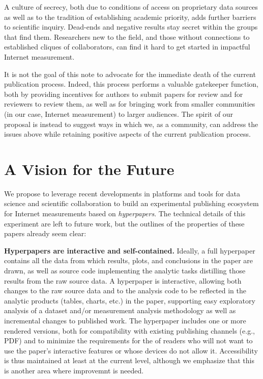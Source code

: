 \documentclass[sigconf,10pt]{acmart}
\begin{document}
A culture of secrecy, both due to conditions of access on proprietary data
sources as well as to the tradition of establishing academic priority, adds
further barriers to scientific inquiry. Dead-ends and negative results stay
secret within the groups that find them. Researchers new to the field, and those
without connections to established cliques of collaborators, can find it hard to
get started in impactful Internet measurement. 

It is not the goal of this note to advocate for the immediate death of the
current publication process. Indeed, this process performs a valuable gatekeeper
function, both by providing incentives for authors to submit papers for review
and for reviewers to review them, as well as for bringing work from smaller
communities (in our case, Internet measurement) to larger audiences. The spirit
of our proposal is instead to suggest ways in which we, as a community, can
address the issues above while retaining positive aspects of the current
publication process.

\section{A Vision for the Future}
\label{sec:vision}

We propose to leverage recent developments in platforms and tools for data
science and scientific collaboration to build an experimental publishing
ecosystem for Internet measurements based on {\em hyperpapers}. The technical
details of this experiment are left to future work, but the outlines of the
properties of these papers already seem clear:

\textbf{Hyperpapers are interactive and self-contained.} Ideally, a full
hyperpaper contains all the data from which results, plots, and conclusions in
the paper are drawn, as well as source code implementing the analytic tasks
distilling those results from the raw source data. A hyperpaper is interactive,
allowing both changes to the raw source data and to the analysis code to be
reflected in the analytic products (tables, charts, etc.) in the paper,
supporting easy exploratory analysis of a dataset and/or measurement analysis
methodology as well as incremental changes to published work. The hyperpaper
includes one or more rendered versions, both for compatibility with existing
publishing channels (e.g., PDF) and to minimize the requirements for the of
readers who will not want to use the paper's interactive features or whose
devices do not allow it. Accessibility is thus maintained at least at the
current level, although we emphasize that this is another area where improvemnt
is needed.
\end{document}
